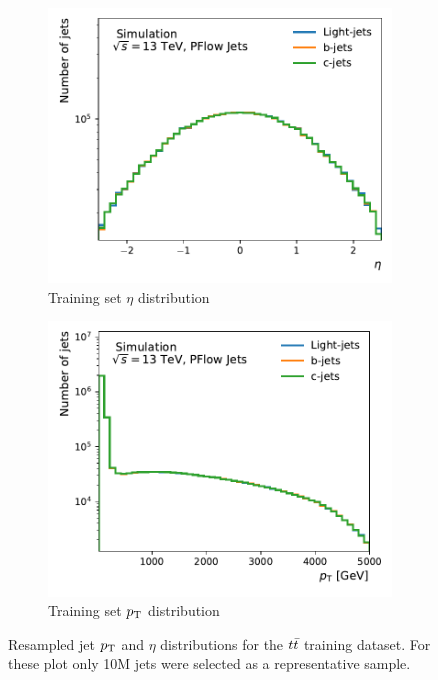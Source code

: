\begin{figure}
    \centering
    \begin{subfigure}[b]{0.49\textwidth}
        \centering
        \includegraphics[width=\textwidth]{figures/flavour_tagging/train_0.pdf}
        \caption{Training set $\eta$ distribution}
        \label{fig:train_eta}
    \end{subfigure}
    \begin{subfigure}[b]{0.49\textwidth}
        \centering
        \includegraphics[width=\textwidth]{figures/flavour_tagging/train_1.pdf}
        \caption{Training set $p_{\text{T}}$ distribution}
        \label{fig:train_pt}
    \end{subfigure}
    \caption{Resampled jet $p_{\text{T}}$ and $\eta$ distributions for the $t\bar{t}$ training dataset. For these plot only 10M jets were selected as a representative sample.}
    \label{fig:train_jet_pt_eta}
\end{figure}

